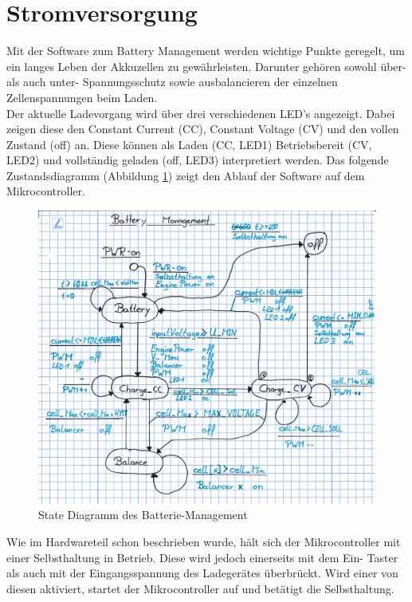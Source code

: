 \section{Stromversorgung} \label{SW_Stromversorgung}
Mit der Software zum Battery Management werden wichtige Punkte geregelt, um ein langes Leben der Akkuzellen zu gewährleisten. Darunter gehören sowohl über- als auch unter- Spannungsschutz sowie ausbalancieren der einzelnen Zellenspannungen beim Laden. \\
Der aktuelle Ladevorgang wird über drei verschiedenen LED’s angezeigt. Dabei zeigen diese den Constant Current (CC), Constant Voltage (CV) und den vollen Zustand (off) an. Diese können als Laden (CC, LED1) Betriebsbereit (CV, LED2) und vollständig geladen (off, LED3) interpretiert werden. 
Das folgende Zustandsdiagramm (Abbildung \ref{fig:statediagrammbatterie}) zeigt den Ablauf der Software auf dem Mikrocontroller.
\begin{figure} [H]
	\centering
	\includegraphics[width=1\linewidth]{images/Statediagramm_Batterie}
	\caption{State Diagramm des Batterie-Management}
	\label{fig:statediagrammbatterie}
\end{figure}
Wie im Hardwareteil schon beschrieben wurde, hält sich der Mikrocontroller mit einer Selbsthaltung in Betrieb. Diese wird jedoch einerseits mit dem Ein- Taster als auch mit der Eingangsspannung des Ladegerätes überbrückt. Wird einer von diesen aktiviert, startet der Mikrocontroller auf und betätigt die Selbsthaltung. \\

